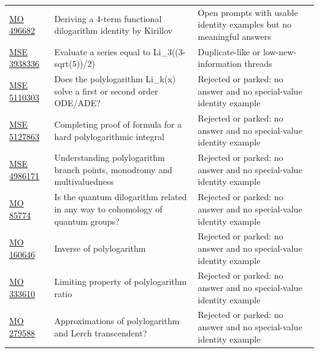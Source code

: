 \begin{longtable}{@{}p{}p{}p{}@{}}
\href{https://mathoverflow.net/questions/496682/deriving-a-4-term-functional-dilogarithm-identity-by-kirillov}{MO 496682} & Deriving a 4-term functional dilogarithm identity by Kirillov & Open prompts with usable identity examples but no meaningful answers\\
\href{https://math.stackexchange.com/questions/3938336/evaluate-sum-limits-n-1-infty-frac-left-frac3-sqrt52-right}{MSE 3938336} & Evaluate a series equal to Li\_3((3-sqrt(5))/2) & Duplicate-like or low-new-information threads\\
\href{https://math.stackexchange.com/questions/5110303/does-the-polylogarithm-mathrmli-kx-solve-a-first-or-second-order-ode-ade}{MSE 5110303} & Does the polylogarithm Li\_k(x) solve a first or second order ODE/ADE? & Rejected or parked: no answer and no special-value identity example\\
\href{https://math.stackexchange.com/questions/5127863/completing-proof-of-formula-for-a-hard-polylogarithmic-integral}{MSE 5127863} & Completing proof of formula for a hard polylogarithmic integral & Rejected or parked: no answer and no special-value identity example\\
\href{https://math.stackexchange.com/questions/4986171/understanding-polylogarithms-branch-points-monodromy-and-multivaluedness-espec}{MSE 4986171} & Understanding polylogarithm branch points, monodromy and multivaluedness & Rejected or parked: no answer and no special-value identity example\\
\href{https://mathoverflow.net/questions/85774/is-the-quantum-dilogarithm-related-in-any-way-to-cohomology-of-quantum-groups}{MO 85774} & Is the quantum dilogarithm related in any way to cohomology of quantum groups? & Rejected or parked: no answer and no special-value identity example\\
\href{https://mathoverflow.net/questions/160646/inverse-of-polylogarithm}{MO 160646} & Inverse of polylogarithm & Rejected or parked: no answer and no special-value identity example\\
\href{https://mathoverflow.net/questions/333610/limiting-property-of-polylogarithm-ratio}{MO 333610} & Limiting property of polylogarithm ratio & Rejected or parked: no answer and no special-value identity example\\
\href{https://mathoverflow.net/questions/279588/approximations-of-polylogarithm-and-lerch-transcendent}{MO 279588} & Approximations of polylogarithm and Lerch transcendent? & Rejected or parked: no answer and no special-value identity example\\

\end{longtable}
